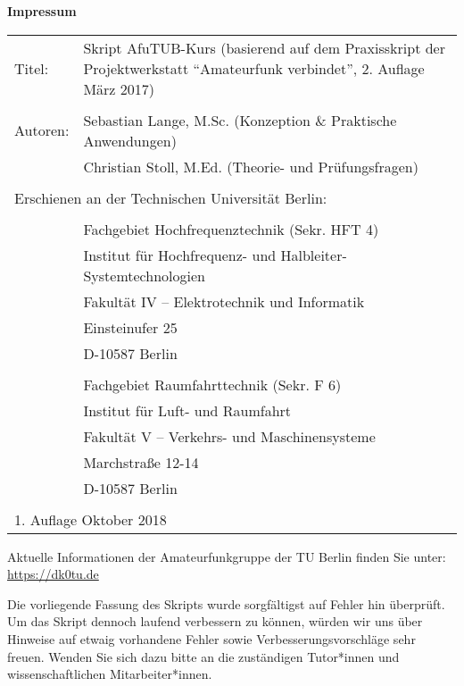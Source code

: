 \thispagestyle{empty}

\hspace{.1cm}
\begin{minipage}[t]{13cm}

  \textbf{Impressum}\\

  \begin{tabular}{p{1cm} p{11cm}}
    Titel: &  Skript AfuTUB-Kurs (basierend auf dem Praxisskript der
    Projektwerkstatt "`Amateurfunk verbindet"', 2. Auflage März 2017)\\
    & \\
    Autoren: & Sebastian Lange, M.Sc. (Konzeption \& Praktische Anwendungen)\\
    & Christian Stoll, M.Ed. (Theorie- und Prüfungsfragen)\\
    & \\
    \multicolumn{2}{l}{Erschienen an der Technischen Universität Berlin:}\\
    &\\
    & Fachgebiet Hochfrequenztechnik (Sekr. HFT 4)\\
    & Institut für Hochfrequenz- und Halbleiter-Systemtechnologien\\
    & Fakultät IV -- Elektrotechnik und Informatik \\
    & Einsteinufer 25 \\
    & D-10587 Berlin \\
    & \\
    & Fachgebiet Raumfahrttechnik (Sekr. F 6)\\
    & Institut für Luft- und Raumfahrt\\
    & Fakultät V -- Verkehrs- und Maschinensysteme\\
    & Marchstraße 12-14\\
    & D-10587 Berlin\\
    &\\
    \multicolumn{2}{l}{1. Auflage Oktober 2018}\\
  \end{tabular}

  \vspace{3cm}

  Aktuelle Informationen der Amateurfunkgruppe der TU Berlin finden Sie unter:\\
  \url{https://dk0tu.de}

  \vspace{1cm}

  Die vorliegende Fassung des Skripts wurde sorgfältigst auf Fehler hin
  überprüft. Um das Skript dennoch laufend verbessern zu können, würden wir uns
  über Hinweise auf etwaig vorhandene Fehler sowie Verbesserungsvorschläge sehr
  freuen. Wenden Sie sich dazu bitte an die zuständigen Tutor*innen und
  wissenschaftlichen Mitarbeiter*innen.

\end{minipage}

